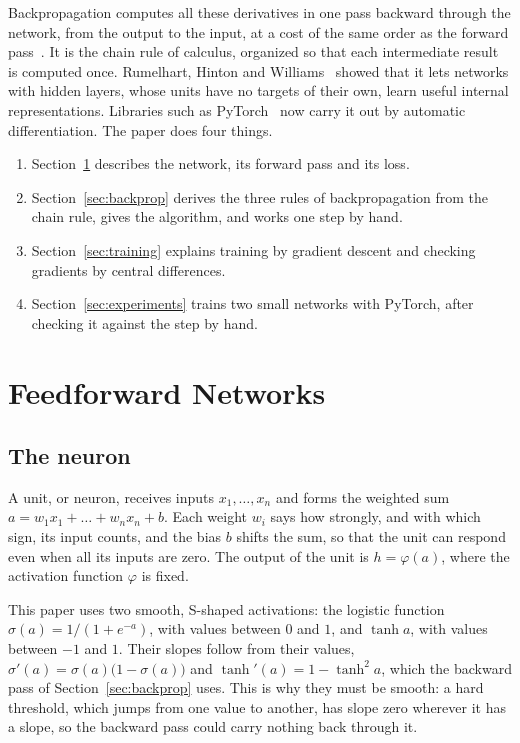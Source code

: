 \documentclass[11pt,a4paper]{amsart}
\numberwithin{equation}{section}
\theoremstyle{plain}
\theoremstyle{definition}
\theoremstyle{remark}
\begin{document}
Backpropagation computes all these derivatives in one pass backward
through the network, from the output to the input, at a cost of the same
order as the forward pass~\cite{rumelhart1986,haykin1998}. It is the
chain rule of calculus, organized so that each intermediate result is
computed once. Rumelhart, Hinton and Williams~\cite{rumelhart1986}
showed that it lets networks with hidden layers, whose units have no
targets of their own, learn useful internal representations. Libraries
such as PyTorch~\cite{paszke2019} now carry it out by automatic
differentiation. The paper does four things.
\begin{enumerate}[leftmargin=*, nosep]
\item Section~\ref{sec:networks} describes the network, its forward pass
  and its loss.
\item Section~\ref{sec:backprop} derives the three rules of
  backpropagation from the chain rule, gives the algorithm, and works
  one step by hand.
\item Section~\ref{sec:training} explains training by gradient descent
  and checking gradients by central differences.
\item Section~\ref{sec:experiments} trains two small networks with
  PyTorch, after checking it against the step by hand.
\end{enumerate}

\section{Feedforward Networks}\label{sec:networks}

\subsection{The neuron}\label{sec:neuron}

A unit, or neuron, receives inputs $x_1, \dots, x_n$ and forms the
weighted sum $a = w_1 x_1 + \dots + w_n x_n + b$. Each weight $w_i$ says
how strongly, and with which sign, its input counts, and the bias $b$
shifts the sum, so that the unit can respond even when all its inputs
are zero. The output of the unit is ${h = \varphi(a)}$, where the
activation function $\varphi$ is fixed.

This paper uses two smooth, S-shaped activations: the logistic function
${\sigma(a) = 1/(1 + e^{-a})}$, with values between $0$ and $1$, and
$\tanh a$, with values between $-1$ and $1$. Their slopes follow from
their values, ${\sigma'(a) = \sigma(a)\bigl(1 - \sigma(a)\bigr)}$ and
${\tanh'(a) = 1 - \tanh^2 a}$, which the backward pass of
Section~\ref{sec:backprop} uses. This is why they must be smooth: a hard
threshold, which jumps from one value to another, has slope zero
wherever it has a slope, so the backward pass could carry nothing back
through it.
\end{document}
